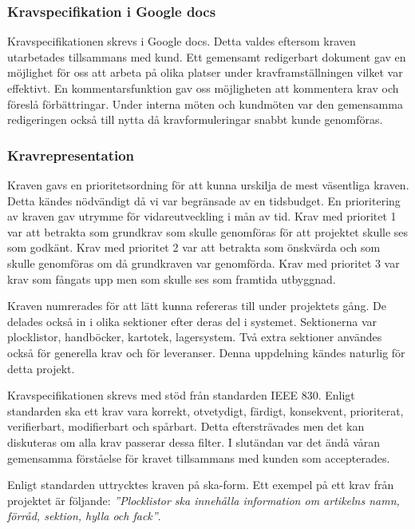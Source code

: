 \documentclass{article}
\begin{document}
\subsubsection{Kravspecifikation i Google docs}
Kravspecifikationen skrevs i Google docs. Detta valdes eftersom kraven utarbetades tillsammans med kund. Ett gemensamt redigerbart dokument gav en möjlighet för oss att arbeta på olika platser under kravframställningen vilket var effektivt. En kommentarsfunktion gav oss möjligheten att kommentera krav och föreslå förbättringar. Under interna möten och kundmöten var den gemensamma redigeringen också till nytta då kravformuleringar snabbt kunde genomföras.

\subsubsection{Kravrepresentation}
Kraven gavs en prioritetsordning för att kunna urskilja de mest väsentliga kraven. Detta kändes nödvändigt då vi var begränsade av en tidsbudget. En prioritering av kraven gav utrymme för vidareutveckling i mån av tid. Krav med prioritet 1 var att betrakta som grundkrav som skulle genomföras för att projektet skulle ses som godkänt. Krav med prioritet 2 var att betrakta som önskvärda och som skulle genomföras om då grundkraven var genomförda. Krav med prioritet 3 var krav som fångats upp men som skulle ses som framtida utbyggnad. 

Kraven numrerades för att lätt kunna refereras till under projektets gång. De delades också in i olika sektioner efter deras del i systemet. Sektionerna var plocklistor, handböcker, kartotek, lagersystem. Två extra sektioner användes också för generella krav och för leveranser. Denna uppdelning kändes naturlig för detta projekt. 

Kravspecifikationen skrevs med stöd från standarden IEEE 830. Enligt standarden ska ett krav vara korrekt, otvetydigt, färdigt, konsekvent, prioriterat, verifierbart, modifierbart och spårbart. Detta eftersträvades men det kan diskuteras om alla krav passerar dessa filter. I slutändan var det ändå våran gemensamma förståelse för kravet tillsammans med kunden som accepterades. 

Enligt standarden uttrycktes kraven på ska-form. Ett exempel på ett krav från projektet är följande: \textit{''Plocklistor ska innehålla information om artikelns namn, förråd, sektion, hylla och fack''}.
\end{document}
